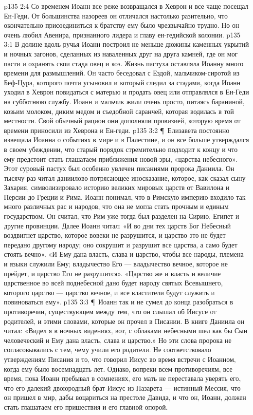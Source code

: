 \vs p135 2:4 Со временем Иоанн все реже возвращался в Хеврон и все чаще посещал Ен\hyp{}Геди. От большинства назореев он отличался настолько разительно, что окончательно присоединиться к братству ему было чрезвычайно трудно. Но он очень любил Авенира, признанного лидера и главу ен\hyp{}гедийской колонии.
\vs p135 3:1 В долине вдоль ручья Иоанн построил не меньше дюжины каменных укрытий и ночных загонов, сделанных из наваленных друг на друга камней, где он мог пасти и охранять свои стада овец и коз. Жизнь пастуха оставляла Иоанну много времени для размышлений. Он часто беседовал с Ездой, мальчиком\hyp{}сиротой из Беф\hyp{}Цура, которого почти усыновил и который следил за стадами, когда Иоанн уходил в Хеврон повидаться с матерью и продать овец или отправлялся в Ен\hyp{}Геди на субботнюю службу. Иоанн и мальчик жили очень просто, питаясь бараниной, козьим молоком, диким медом и съедобной саранчей, которая водилась в той местности. Свой обычный рацион они дополняли провизией, которую время от времени приносили из Хеврона и Ен\hyp{}геди.
\vs p135 3:2 \P\ Елизавета постоянно извещала Иоанна о событиях в мире и в Палестине, и он все больше утверждался в своем убеждении, что старый порядок стремительно подходит к концу и что ему предстоит стать глашатаем приближения новой эры, «царства небесного». Этот суровый пастух был особенно увлечен писаниями пророка Даниила. Он тысячу раз читал даниилово потрясающее иносказание, которое, как сказал сыну Захария, символизировало историю великих мировых царств от Вавилона и Персии до Греции и Рима. Иоанн понимал, что в Римскую империю входило так много различных рас и народов, что она не могла стать прочным и единым государством. Он считал, что Рим уже тогда был разделен на Сирию, Египет и другие провинции. Далее Иоанн читал: «И во дни тех царств Бог Небесный воздвигнет царство, которое вовеки не разрушится, и царство это не будет передано другому народу; оно сокрушит и разрушит все царства, а само будет стоять вечно». «И Ему дана власть, слава и царство, чтобы все народы, племена и языки служили Ему; владычество Его --- владычество вечное, которое не прейдет, и царство Его не разрушится». «Царство же и власть и величие царственное во всей поднебесной дано будет народу святых Всевышнего, которого царство --- царство вечное, и все властители будут служить и повиноваться ему».
\vs p135 3:3 \P\ Иоанн так и не сумел до конца разобраться в противоречии, существующем между тем, что он слышал об Иисусе от родителей, и этими словами, которые он прочел в Писании. В книге Даниила он читал: «Видел я в ночных видениях, вот, с облаками небесными шел как бы Сын человеческий и Ему дана власть, слава и царство.» Но эти слова пророка не согласовывались с тем, чему учили его родители. Не соответствовало утверждениям Писания и то, что говорил Иисус во время встречи с Иоанном, когда ему было восемнадцать лет. Однако, вопреки всем противоречиям, все время, пока Иоанн пребывал в сомнениях, его мать не переставала уверять его, что его далекий двоюродный брат Иисус из Назарета --- истинный Мессия, что он пришел в мир, дабы воцариться на престоле Давида, и что он, Иоанн, должен стать глашатаем его пришествия и его главной опорой.
